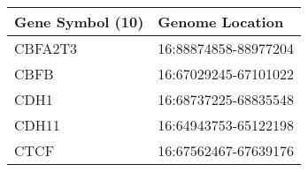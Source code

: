 \begin{tabular}{ll}
\toprule
Gene Symbol (10) &      Genome Location \\
\midrule
         CBFA2T3 & 16:88874858-88977204 \\
            CBFB & 16:67029245-67101022 \\
            CDH1 & 16:68737225-68835548 \\
           CDH11 & 16:64943753-65122198 \\
            CTCF & 16:67562467-67639176 \\
\bottomrule
\end{tabular}
